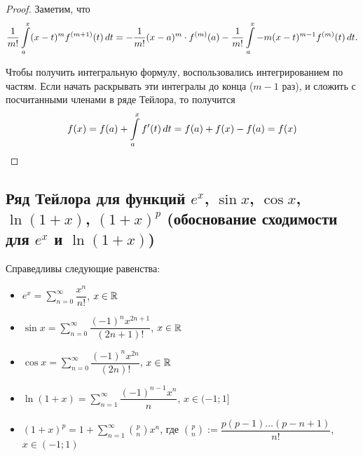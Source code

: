\documentclass[a4paper]{article}
\theoremstyle{named}
\renewcommand{\int}{\intop}
\begin{document}
    	\begin{proof}
    		Заметим, что
    		\begin{equation*}
    			\dfrac{1}{m!} \int_a^x (x - t)^m f^{(m + 1)}(t) \dd t
    			= -\dfrac{1}{m!}(x - a)^m \cdot f^{(m)}(a) - \dfrac{1}{m!} \int_a^x -m(x - t)^{m - 1}f^{(m)}(t) \dd t.
    		\end{equation*}

    		Чтобы получить интегральную формулу, воспользовались интегрированием по частям. Если начать раскрывать эти интегралы до конца ($m - 1$ раз), и сложить с посчитанными членами в ряде Тейлора, то получится
    		\begin{equation*}
    			f(x) = f(a) + \int_a^x f'(t) \dd t = f(a) + f(x) - f(a) = f(x)
    		\end{equation*}
    	\end{proof}

    	\subsection{Ряд Тейлора для функций $e^x$, $\sin x$, $\cos x$, $\ln(1 + x)$, $(1 + x)^p$ (обоснование сходимости для $e^x$ и $\ln(1 + x)$)}

    	\begin{consequence*}
    		Справедливы следующие равенства:

    		\begin{itemize}
    		\item
    			$e^x = \sum_{n = 0}^{\infty} \dfrac{x^n}{n!}$, $x \in \mathbb{R}$

    		\item
    			$\sin x = \sum_{n = 0}^{\infty} \dfrac{(-1)^n x^{2n + 1}}{(2n + 1)!}$, $x \in \mathbb{R}$

    		\item
    			$\cos x = \sum_{n = 0}^{\infty} \dfrac{(-1)^n x^{2n}}{(2n)!}$, $x \in \mathbb{R}$

    		\item
    			$\ln(1 + x) = \sum_{n = 1}^{\infty} \dfrac{(-1)^{n - 1}x^n}{n}$, $x \in (-1; 1]$

    		\item
    			$(1 + x)^p = 1 + \sum_{n = 1}^{\infty} \binom{p}{n} x^n$, где $\binom{p}{n} := \dfrac{p(p - 1) \dots (p - n + 1)}{n!}$, $x \in (-1; 1)$
    		\end{itemize}
    	\end{consequence*}
\end{document}
